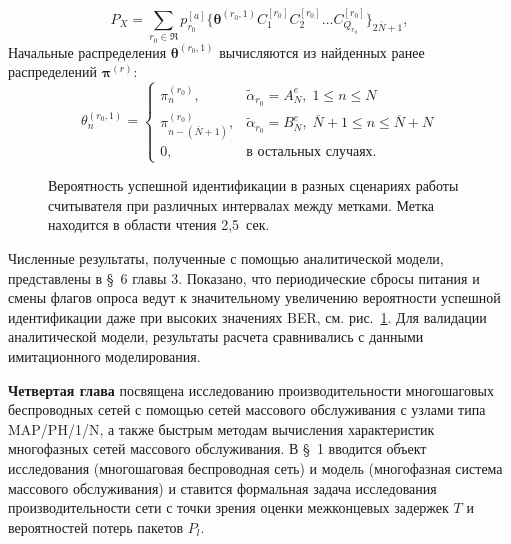 $$
	P_X = \sum\limits_{r_0 \in \mathfrak{R}} p_{r_0}^{[a]} \{ \bm{\theta}^{(r_0,1)} C_1^{[r_0]} C_2^{[r_0]} \dots C_{Q_{r_0}}^{[r_0]} \}_{2\overline{N}+1},
$$
Начальные распределения $\bm{\theta}^{(r_0,1)}$ вычисляются из найденных ранее распределений $\bm{\pi}^{(r)}$:
$$
  \theta_n^{(r_0,1)} = \begin{cases}
    \pi^{(r_0)}_n,                      &\widetilde{\alpha}_{r_0} = A^e_N,\; 1 \leqslant n \leqslant N\\
    \pi^{(r_0)}_{n - (\overline{N}+1)}, &\widetilde{\alpha}_{r_0} = B^e_N,\; \overline{N}+1 \leqslant n \leqslant \overline{N}+N\\
    0,                                  &\text{в остальных случаях.}
  \end{cases}
$$

\begin{figure}[ht!]
  \caption{Вероятность успешной идентификации в разных сценариях работы считывателя при различных интервалах между метками. Метка находится в области чтения 2,5~сек.}\label{fig:id_prob_var_scenario}
\end{figure}

Численные результаты, полученные с помощью аналитической модели, представлены в \S~6 главы 3. Показано, что периодические сбросы питания и смены флагов опроса ведут к значительному увеличению вероятности успешной идентификации даже при высоких значениях BER, см. рис.~\ref{fig:id_prob_var_scenario}. Для валидации аналитической модели, результаты расчета сравнивались с данными имитационного моделирования.



\textbf{Четвертая глава}
посвящена исследованию производительности многошаговых беспроводных сетей с помощью сетей массового обслуживания с узлами типа MAP/PH/1/N, а также быстрым методам вычисления характеристик многофазных сетей массового обслуживания. В \S~1 вводится объект исследования (многошаговая беспроводная сеть) и модель (многофазная система массового обслуживания) и ставится формальная задача исследования производительности сети с точки зрения оценки межконцевых задержек $T$ и вероятностей потерь пакетов $P_l$.

